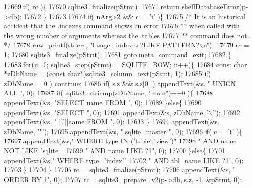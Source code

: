 \begin{DoxyCode}
{{{{{{{{{{{{{{{{{{{{{{{{{{{{{{{{{{{{{{{{{{{{{{{{{{{{{{{{{{{{{{{{{{{{{{{{{{{{{{{{{{{{{{{{{{{{{{{{{{{{{{{{{{{{{{{{{{{{{{{{{{{{{{{{{{{{{{{17669     \textcolor{keywordflow}{if}( rc )\{
17670       sqlite3_finalize(pStmt);
17671       \textcolor{keywordflow}{return} shellDatabaseError(p->db);
17672     \}
17673 
17674     \textcolor{keywordflow}{if}( nArg>2 && c==\textcolor{charliteral}{'i'} )\{
17675       \textcolor{comment}{/* It is an historical accident that the .indexes command shows an error}
17676 \textcolor{comment}{      ** when called with the wrong number of arguments whereas the .tables}
17677 \textcolor{comment}{      ** command does not. */}
17678       raw_printf(stderr, \textcolor{stringliteral}{"Usage: .indexes ?LIKE-PATTERN?\(\backslash\)n"});
17679       rc = 1;
17680       sqlite3_finalize(pStmt);
17681       \textcolor{keywordflow}{goto} meta\_command\_exit;
17682     \}
17683     \textcolor{keywordflow}{for}(ii=0; sqlite3_step(pStmt)==SQLITE_ROW; ii++)\{
17684       \textcolor{keyword}{const} \textcolor{keywordtype}{char} *zDbName = (\textcolor{keyword}{const} \textcolor{keywordtype}{char}*)sqlite3_column_text(pStmt, 1);
17685       \textcolor{keywordflow}{if}( zDbName==0 ) \textcolor{keywordflow}{continue};
17686       \textcolor{keywordflow}{if}( s.z && s.z[0] ) appendText(&s, \textcolor{stringliteral}{" UNION ALL "}, 0);
17687       \textcolor{keywordflow}{if}( sqlite3_stricmp(zDbName, \textcolor{stringliteral}{"main"})==0 )\{
17688         appendText(&s, \textcolor{stringliteral}{"SELECT name FROM "}, 0);
17689       \}\textcolor{keywordflow}{else}\{
17690         appendText(&s, \textcolor{stringliteral}{"SELECT "}, 0);
17691         appendText(&s, zDbName, \textcolor{charliteral}{'\(\backslash\)''});
17692         appendText(&s, \textcolor{stringliteral}{"||'.'||name FROM "}, 0);
17693       \}
17694       appendText(&s, zDbName, \textcolor{charliteral}{'"'});
17695       appendText(&s, \textcolor{stringliteral}{".sqlite\_master "}, 0);
17696       \textcolor{keywordflow}{if}( c==\textcolor{charliteral}{'t'} )\{
17697         appendText(&s,\textcolor{stringliteral}{" WHERE type IN ('table','view')"}
17698                       \textcolor{stringliteral}{"   AND name NOT LIKE 'sqlite\_%
17699                       \textcolor{stringliteral}{"   AND name LIKE ?1"}, 0);
17700       \}\textcolor{keywordflow}{else}\{
17701         appendText(&s,\textcolor{stringliteral}{" WHERE type='index'"}
17702                       \textcolor{stringliteral}{"   AND tbl\_name LIKE ?1"}, 0);
17703       \}
17704     \}
17705     rc = sqlite3_finalize(pStmt);
17706     appendText(&s, \textcolor{stringliteral}{" ORDER BY 1"}, 0);
17707     rc = sqlite3_prepare_v2(p->db, s.z, -1, &pStmt, 0);
}}}}}}}}}}}}}}}}}}}}}}}}}}}}}}}}}}}}}}}}}}}}}}}}}}}}}}}}}}}}}}}}}}}}}}}}}}}}}}}}}}}}}}}}}}}}}}}}}}}}}}}}}}}}}}}}}}}}}}}}}}}}}}}}}}}}}}}}
\end{DoxyCode}
